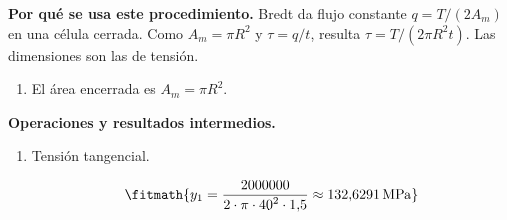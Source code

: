 \noindent\textbf{Por qué se usa este procedimiento.} Bredt da flujo constante $q=T/(2A_m)$ en una célula cerrada. Como $A_m=\pi R^2$ y $\tau=q/t$, resulta $\tau=T/(2\pi R^2t)$. Las dimensiones son las de tensión.

\begin{enumerate}

\item El área encerrada es $A_m = \pi R^2$.

\end{enumerate}

\noindent\textbf{Operaciones y resultados intermedios.}

\begin{enumerate}

\item Tensión tangencial.

\[\fitmath{y_{1}=\frac{2000000}{2\cdot \pi\cdot {40}^{2}\cdot 1{,}5}\approx 132{,}6291\,\mathrm{MPa}}\]

\end{enumerate}
